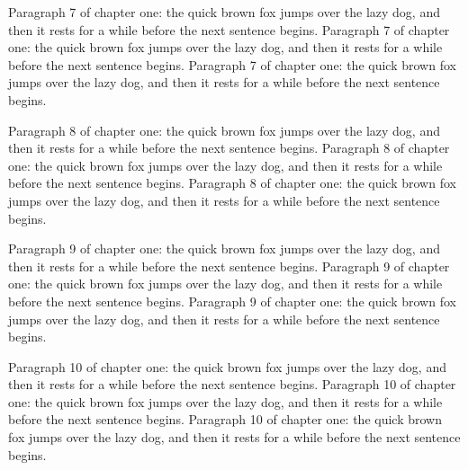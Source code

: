 Paragraph 7 of chapter one: the quick brown fox jumps over the lazy dog, and then it rests for a while before the next sentence begins. Paragraph 7 of chapter one: the quick brown fox jumps over the lazy dog, and then it rests for a while before the next sentence begins. Paragraph 7 of chapter one: the quick brown fox jumps over the lazy dog, and then it rests for a while before the next sentence begins. 

Paragraph 8 of chapter one: the quick brown fox jumps over the lazy dog, and then it rests for a while before the next sentence begins. Paragraph 8 of chapter one: the quick brown fox jumps over the lazy dog, and then it rests for a while before the next sentence begins. Paragraph 8 of chapter one: the quick brown fox jumps over the lazy dog, and then it rests for a while before the next sentence begins. 

Paragraph 9 of chapter one: the quick brown fox jumps over the lazy dog, and then it rests for a while before the next sentence begins. Paragraph 9 of chapter one: the quick brown fox jumps over the lazy dog, and then it rests for a while before the next sentence begins. Paragraph 9 of chapter one: the quick brown fox jumps over the lazy dog, and then it rests for a while before the next sentence begins. 

Paragraph 10 of chapter one: the quick brown fox jumps over the lazy dog, and then it rests for a while before the next sentence begins. Paragraph 10 of chapter one: the quick brown fox jumps over the lazy dog, and then it rests for a while before the next sentence begins. Paragraph 10 of chapter one: the quick brown fox jumps over the lazy dog, and then it rests for a while before the next sentence begins. 


